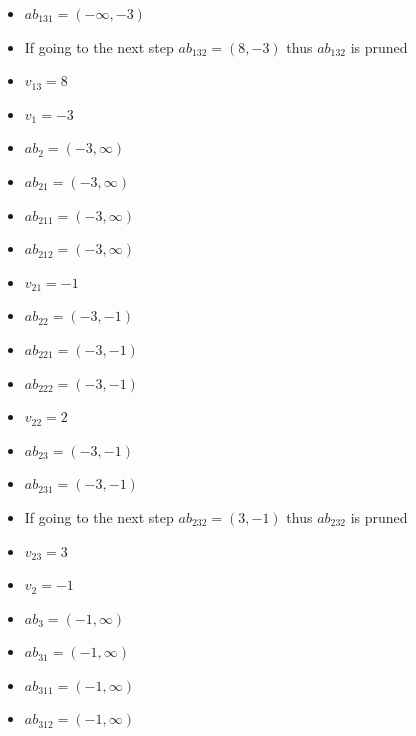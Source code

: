 \documentclass[11pt]{article}
\begin{document}
\begin{enumerate}
\begin{itemize}
    \item 
    $ab_{131} = (-\infty, -3)$

    \item 
    If going to the next step $ab_{132}=(8, -3)$ thus $ab_{132}$ is pruned

    \item 
    $v_{13} = 8$

    \item 
    $v_{1} = -3$

    \item 
    $ab_2 = (-3, \infty)$

    \item 
    $ab_{21} = (-3, \infty)$
    
    \item 
    $ab_{211} = (-3, \infty)$

    \item 
    $ab_{212} = (-3, \infty)$

    \item 
    $v_{21} = -1$

    \item 
    $ab_{22} = (-3, -1)$

    \item 
    $ab_{221} = (-3, -1)$

    \item 
    $ab_{222} = (-3, -1)$

    \item 
    $v_{22} = 2$

    \item 
    $ab_{23} = (-3, -1)$

    \item 
    $ab_{231} = (-3, -1)$

    \item 
    If going to the next step $ab_{232}=(3, -1)$ thus $ab_{232}$ is pruned

    \item 
    $v_{23} = 3$

    \item 
    $v_{2} = -1$

    \item 
    $ab_3 = (-1, \infty)$

    \item 
    $ab_{31} = (-1, \infty)$

    \item 
    $ab_{311} = (-1, \infty)$

    \item 
    $ab_{312} = (-1, \infty)$


\end{itemize}
\end{enumerate}
\end{document}
